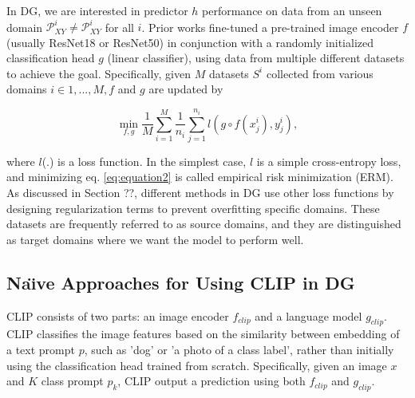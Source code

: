 \documentclass[11pt,twocolumn]{article}
\begin{document}
\hspace{1cm}
In DG, we are interested in predictor $h$ performance on data from an unseen domain \begin{math}\mathcal{P}_{XY}^i \neq \mathcal{P}_{XY}^i\end{math} for all $i$. Prior works fine-tuned a  pre-trained image encoder $f$ (usually ResNet18 or ResNet50) in conjunction with a randomly initialized classification head $g$ (linear classifier), using data from multiple different datasets to achieve the goal. Specifically, given $M$ datasets $S^i$ collected from various domains \begin{math}i \in {1,...,M}, f\end{math} and $g$ are updated by

\begin{equation}
    \min_{f,g} \frac{1}{M} \sum_{i=1}^{M} \frac{1}{n_i} \sum_{j=1}^{n_i} l(g \circ f(x_j^i),y_j^i),
\end{equation}

where $l$(.) is a loss function. In the simplest case, $l$ is a simple cross-entropy loss, and minimizing eq. \ref{eq:equation2} is called empirical risk minimization (ERM). As discussed in Section ??, different methods in DG use other loss functions by designing regularization terms to prevent overfitting specific domains. These datasets are frequently referred to as source domains, and they are distinguished as target domains where we want the model to perform well.

\subsection{Na\"{\i}ve Approaches for Using CLIP in DG}
CLIP consists of two parts: an image encoder $f_{clip}$ and a language model $g_{clip}$. CLIP classifies the image features based on the similarity between embedding of a text prompt $p$, such as 'dog' or 'a photo of a class label', rather than initially using the classification head trained from scratch. Specifically, given an image $x$ and $K$ class prompt $p_k$, CLIP output a prediction using both $f_{clip}$ and $g_{clip}$.
\end{document}
